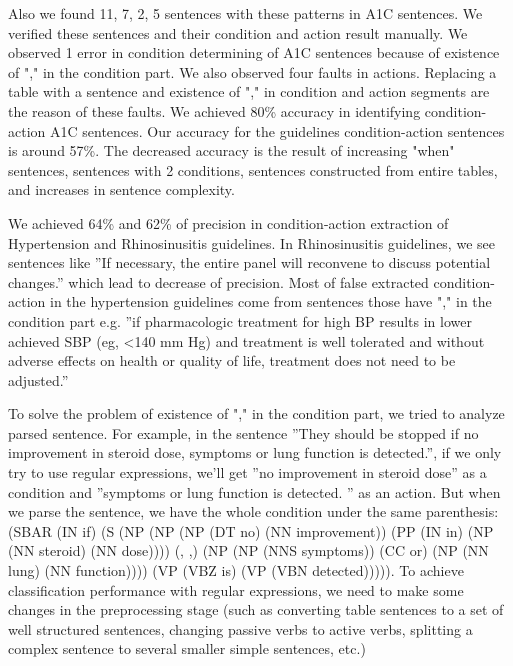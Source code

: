 \documentclass[12pt,letterpaper]{article}
\begin{document}
Also we found 11, 7, 2, 5 sentences with these patterns in A1C sentences. We verified these sentences and their condition and action result manually. We observed 1 error in condition determining of A1C sentences because of existence of "," in the condition part. We also observed four faults in actions. Replacing a table with a sentence and existence of "," in condition and action segments are the reason of these faults. We achieved 80\% accuracy in identifying condition-action A1C sentences. Our accuracy for the guidelines condition-action sentences is around 57\%. The decreased accuracy is the result of increasing "when" sentences, sentences with 2 conditions, sentences constructed from entire tables, and increases in sentence complexity.

We achieved 64\% and 62\% of precision in condition-action extraction of Hypertension \cite{doi:10.1001/jama.2013.284427} and Rhinosinusitis\cite{chow2012idsa} guidelines. In Rhinosinusitis guidelines, we see sentences like ''If necessary, the entire panel will reconvene to discuss potential changes.'' which lead to decrease of precision. Most of false extracted condition-action in the hypertension guidelines come from sentences those have "," in the condition part e.g. ''if pharmacologic treatment for high BP results in lower achieved SBP (eg, \textless 140 mm Hg) and treatment is well tolerated and without adverse effects on health or quality of life, treatment does not need to be adjusted.''

To solve the problem of existence of "," in the condition part, we tried to analyze parsed sentence. For example, in the sentence ''They should be stopped if no improvement in steroid dose, symptoms or lung function is detected.'', if we only try to use regular expressions, we'll get ''no improvement in steroid dose'' as a condition and ''symptoms or lung function is detected. '' as an action. But when we parse the sentence, we have the whole condition under the same parenthesis:(SBAR (IN if) (S (NP (NP (NP (DT no) (NN improvement)) (PP (IN in) (NP (NN steroid) (NN dose)))) (, ,) (NP (NP (NNS symptoms)) (CC or) (NP (NN lung) (NN function)))) (VP (VBZ is) (VP (VBN detected))))).
To achieve classification performance with regular expressions, we need to make some changes in the preprocessing stage (such as converting table sentences to a set of well structured sentences, changing passive verbs to active verbs, splitting a complex sentence to several smaller simple sentences, etc.)
\end{document}
